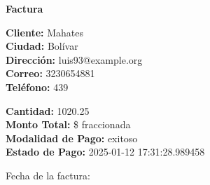 \documentclass{article}
\begin{document}
\begin{center}
    {\LARGE \textbf{Factura}}\\[1cm]
\end{center}

\textbf{Cliente:} Mahates \\
\textbf{Ciudad:} Bolívar \\
\textbf{Dirección:} luis93@example.org \\
\textbf{Correo:} 3230654881 \\
\textbf{Teléfono:} 439 \\

\vspace{0.5cm}

\textbf{Cantidad:} 1020.25 \\
\textbf{Monto Total:} \$ fraccionada \\
\textbf{Modalidad de Pago:} exitoso \\
\textbf{Estado de Pago:} 2025-01-12 17:31:28.989458 \\

\vspace{1cm}

Fecha de la factura: 
\end{document}
